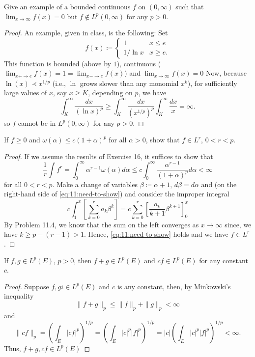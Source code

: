 \begin{problem}
Give an example of a bounded continuous $f$ on $(0,\infty)$ such that
$\lim_{x\to\infty}f(x)=0$ but $f\notin L^p(0,\infty)$ for any $p>0$.
\end{problem}
\begin{proof}
An example, given in class, is the following: Set
\begin{equation}
\label{eq:11:example}
f(x)\coloneqq
\begin{cases}
1&x\leq e\\
1/\ln x&x\geq e.
\end{cases}
\end{equation}
This function is bounded (above by $1$), continuous ($\lim_{x+\to
  e}f(x)=1=\lim_{x-\to e}f(x)$) and $\lim_{x\to\infty}f(x)=0$ Now, because
$\ln(x)\prec x^{1/p}$ (i.e., $\ln$ grows slower than any monomial $x^k$),
for sufficiently large values of $x$, say $x\geq K$, depending on $p$, we
have
\[
\int_K^\infty\frac{dx}{(\ln x)^p}\geq
\int_K^\infty\frac{dx}{{(x^{1/p})}^p}
\int_K^\infty\frac{dx}{x}=\infty.
\]
so $f$ cannot be in $L^p(0,\infty)$ for any $p>0$.
\end{proof}
\newpage

\begin{problem}
If $f\geq 0$ and $\omega(\alpha)\leq c(1+\alpha)^p$ for all $\alpha>0$,
show that $f\in L^r$, $0<r<p$.
\end{problem}
\begin{proof}
If we assume the results of Exercise 16, it suffices to show that
\begin{equation}
\label{eq:11:need-to-show}
\frac{1}{r}\int f^r=\int_0^\infty\alpha^{r-1}\omega(\alpha)d\alpha\leq
c\int_0^\infty\frac{\alpha^{r-1}}{(1+\alpha)^p}d\alpha<\infty
\end{equation}
for all $0<r<p$. Make a change of variables $\beta\coloneqq\alpha+1$,
$d\beta=d\alpha$ and (on the right-hand side of \eqref{eq:11:need-to-show})
and consider the improper integral
\[
c\int_1^x\left[\sum_{k=0}^r
  a_k\beta^{k}\right]=c\sum_{k=0}^r\left[\frac{a_k}{k+1}\beta^{k+1}\right]_0^x
\]
By Problem 11.4, we know that the sum on the left converges as
$x\to\infty$ since, we have $k\geq p-(r-1)>1$. Hence,
\eqref{eq:11:need-to-show} holds and we have $f\in L^r$.
\end{proof}
\newpage
\begin{problem}
 If $f,g\in L^p(E)$, $p>0$, then $f+g\in L^p(E)$ and $cf\in L^p(E)$ for any
 constant $c$.
\end{problem}
\begin{proof}
Suppose $f,gi\in L^p(E)$ and $c$ is any constant, then, by Minkowski's
inequality
\[
\|f+g\|_p\leq\|f\|_p+\|g\|_p<\infty
\]
and
\[
\|cf\|_p=\left(\int_E|cf|^p\right)^{1/p}=
\left(\int_E|c|^p|f|^p\right)^{1/p}=
|c|\left(\int_E|c|^p|f|^p\right)^{1/p}<\infty.
\]
Thus, $f+g,cf\in L^p(E)$
\end{proof}

